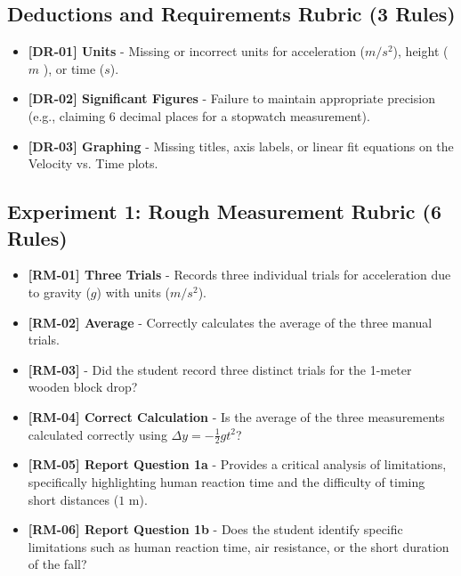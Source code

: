 \documentclass{article}
\begin{document}
\subsection*{Deductions and Requirements Rubric (3 Rules)}
\begin{itemize}
\item \textbf{ [DR-01] Units } - Missing or incorrect units for acceleration ($ m/s^2 $), height ( $ m $
), or time ($ s $).
\item \textbf{ [DR-02] Significant Figures } - Failure to maintain appropriate precision (e.g., claiming 6 decimal places for a stopwatch measurement).
\item \textbf{ [DR-03] Graphing } - Missing titles, axis labels, or linear fit equations on the Velocity vs. Time plots.
\end{itemize}

\subsection*{Experiment 1: Rough Measurement Rubric (6 Rules)}
\begin{itemize}
\item \textbf{ [RM-01] Three Trials } - Records three individual trials for acceleration due to gravity ($g$) with units ($m/s^2$).
\item \textbf{ [RM-02] Average } - Correctly calculates the average of the three manual trials.
\item \textbf{ [RM-03] } - Did the student record three distinct trials for the 1-meter wooden block drop?
\item \textbf{ [RM-04] Correct Calculation } - Is the average of the three measurements calculated correctly using $\Delta y = -\frac{1}{2}gt^2$?
\item \textbf{ [RM-05] Report Question 1a } - Provides a critical analysis of limitations, specifically highlighting human reaction time and the difficulty of timing short distances ($1$ m).
\item \textbf{ [RM-06] Report Question 1b } - Does the student identify specific limitations such as human reaction time, air resistance, or the short duration of the fall?
\end{itemize}
\end{document}
